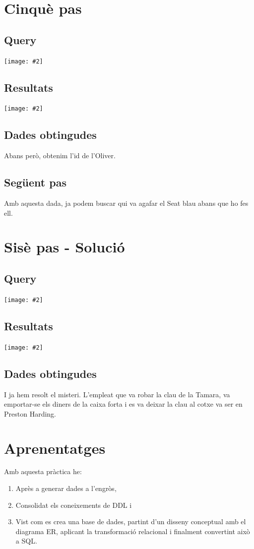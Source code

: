 \documentclass[a4paper,12pt]{article}
\newcommand{\mygraphic}[2][width=\textwidth]{\begin{center}
		\centering\texttt{[image: \#2]}\par
\end{center}}
\begin{document}
\newpage
\section{Cinquè pas}
\subsection{Query}
\mygraphic{imatges/5a.png}
\subsection{Resultats}
\mygraphic{imatges/5b.png}
\subsection{Dades obtingudes}
Abans però, obtenim l'id de l'Oliver.
\subsection{Següent pas}
Amb aquesta dada, ja podem buscar qui va agafar el Seat blau abans que ho fes ell.

\newpage
\section{Sisè pas - Solució}
\subsection{Query}
\mygraphic{imatges/6a.png}
\subsection{Resultats}
\mygraphic{imatges/6b.png}
\subsection{Dades obtingudes}
I ja hem resolt el misteri. L'empleat que va robar la clau de la Tamara, va emportar-se els diners de la caixa forta i es va deixar la clau al cotxe va ser en Preston Harding.

\newpage
\section{Aprenentatges}
Amb aquesta pràctica he:
\begin{enumerate}
	\item Après a generar dades a l'engròs,
	\item Consolidat els coneixements de DDL i
	\item Vist com es crea una base de dades, partint d'un disseny conceptual amb el diagrama ER, aplicant la transformació relacional i finalment convertint això a SQL.
\end{enumerate}
\end{document}
